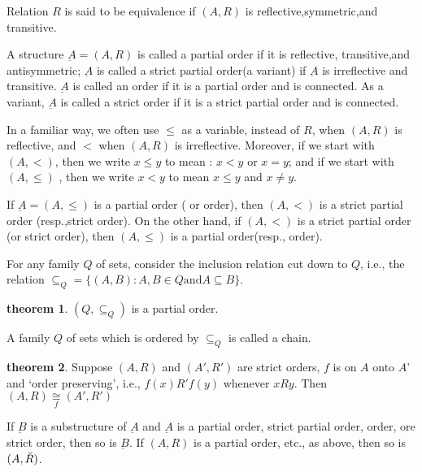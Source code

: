 \documentclass[a4paper,11pt]{article}%
\theoremstyle{remark}
\theoremstyle{definition}
\newtheorem{theorem}{theorem}[section]
\theoremstyle{definition}
\theoremstyle{plain}
\theoremstyle{definition}
\begin{document}
Relation $R$ is said to be equivalence if $(A,R)$ is reflective,symmetric,and transitive.

A structure $\underbar{A}=(A,R)$ is called a partial order if it is reflective, transitive,and antisymmetric;
$\underbar{A}$ is called a strict partial order(a variant) if $\underbar{A}$ is irreflective and transitive.
$\underbar{A}$ is called an order if it is a partial order and is connected.
As a variant, $\underbar{A}$ is called a strict order if it is a strict partial order and is connected.

In a familiar way, we often use $\leq$ as a variable, instead of $R$, when $(A,R)$ is reflective,
and $<$ when $(A,R)$ is irreflective. Moreover, if we start with $(A,<)$, then we write $x\leq y$
to mean : $x<y$ or $x=y$; and if we start with $(A,\leq)$ , then we write $x<y$
to mean $x\leq y$ and $x\neq y$.

If $\underbar{A}=(A,\leq)$ is a partial order ( or order), then $(A,<)$ is 
a strict partial order (resp.,strict order). On the other hand, if $(A,<)$ is a strict partial 
order (or strict order), then $(A,\leq)$ is a partial order(resp., order).

 For any family  $Q$ of sets, consider the inclusion relation cut down to $Q$, i.e., the 
 relation $\subseteq_Q=\{(A,B):A,B\in Q \text{and} A \subseteq B\}.$

 \begin{theorem}
    $(Q,\subseteq_Q)$ is a partial order.
 \end{theorem}

 A family $Q$ of sets which is ordered by $\subseteq_Q$ is called a chain.

\begin{theorem}
    Suppose $(A,R)$ and  $(A',R')$ are strict orders, $f$ is on $A$ 
    onto $A$' and `order preserving', i.e., $f(x)R'f(y)$ whenever $xRy$. 
    Then $(A,R)\underset{f}{\cong}(A',R')$
\end{theorem}

If $\underbar{B}$ is a substructure of $\underbar{A}$ and $\underbar{A}$
is a partial order, strict partial order, order, ore strict order, then so is $\underbar{B}$.
If $(A,R)$ is a partial order, etc., as above, then so is $(A,\Breve{R})$.
\end{document}
